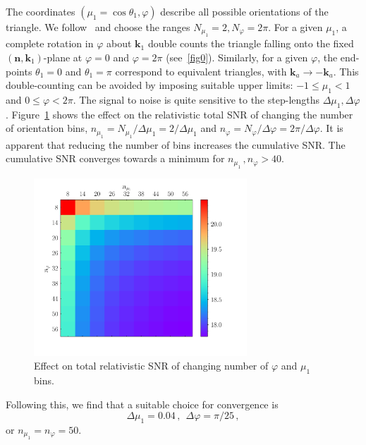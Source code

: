 The coordinates $(\mu_1=\cos\theta_{1},\varphi)$ describe all possible orientations of the triangle. 
We follow~\cite{Karagiannis:2018jdt} and choose the ranges $N_{\mu_1}=2, N_{\varphi}=2\pi$.
For a given $\mu_{1}$, a complete rotation in $\varphi$ about $\bm{k}_1$ double counts the  triangle falling onto the fixed $(\bm{n},\bm{k}_1)$-plane at $\varphi=0$ and $\varphi=2\pi$ (see~\ref{fig0}). Similarly, for a given $\varphi$,  the end-points $\theta_1=0$ and $\theta_1=\pi$  correspond to equivalent triangles, with $\bm{k}_a \to - \bm{k}_a$.
This double-counting can be avoided by imposing suitable upper limits:
$-1\leq \mu_1 <1$ and $0\leq \varphi < 2\pi$.
The signal to noise is quite sensitive to the step-lengths $\Delta \mu_{1}, \Delta\varphi$. Figure~\ref{fig4x} shows the effect on the relativistic total SNR of changing the number of orientation bins, $n_{\mu_1}=N_{\mu_1}/\Delta{\mu_1}=2 /\Delta{\mu_1}$  and $n_\varphi=N_\varphi/\Delta\varphi =2\pi/\Delta\varphi$. It is apparent that reducing the number of bins increases the cumulative SNR. The cumulative SNR converges towards a minimum for $n_{\mu_{1}}\,, n_{\varphi} > 40$.
\begin{figure}[ht]
\centering
\includegraphics[width=8.0cm]{fig/colournmu1nphi_Doppler-eps-converted-to} 
\caption{Effect on 
{total} relativistic SNR of changing number of  $\varphi$ and $\mu_1$ bins. 
} \label{fig4x}
\end{figure} 
%
Following this, we find that a suitable choice for convergence is
\begin{equation}\label{ori}
\Delta \mu_{1}=0.04\,,~~ \Delta\varphi= \pi/25 \,,
\end{equation}
or $n_{\mu_{1}}= n_{\varphi}=50$.

